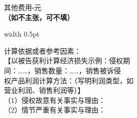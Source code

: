 \begin{tcolorbox}
\begin{minipage}[t]{168bp}
    其他费用$\square$\hspace{2em}元\\
    {\heiti\bfseries（如不主张，可不填）}%
    \vspace{4bp}%
\end{minipage}%
\vrule width 0.5pt%
\hspace{4bp}%
\begin{minipage}[t]{170bp}%
    \vspace{4bp}%
    \songti\mdseries\fontsize{10.5bp}{17bp}\selectfont%
    \baselineskip=17bp\setlength{\parindent}{0pt}\color{inkblack}%
    计算依据或者参考因素：\\[6bp]
    【以被告获利计算经济损失示例：侵权期\\
    间：……，销售数量：……，销售被诉侵\\
    权产品利润计算方法：（写明利润类型，如\\
    营业利润、销售利润等）】\\[6bp]
    （1）侵权故意有关事实与理由：\\[6bp]
    （2）情节严重有关事实与理由：%
    \vspace{4bp}%
\end{minipage}%
\end{tcolorbox}





